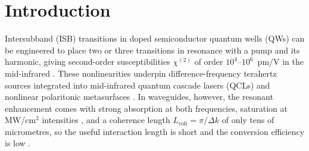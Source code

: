 \documentclass[11pt]{article}
\newcommand{\chitwo}{\chi^{(2)}}
\begin{document}
\begin{abstract}
\end{abstract}

\section{Introduction}
Intersubband (ISB) transitions in doped semiconductor quantum wells (QWs) can be engineered to place two or three transitions in resonance with a pump and its harmonic, giving second-order susceptibilities $\chitwo$ of order $10^4$--$10^6$~pm/V in the mid-infrared \cite{Fejer1989,Rosencher1991,Rosencher1996,Meyer1995,Vurgaftman1996,Vurgaftman2021}. These nonlinearities underpin difference-frequency terahertz sources integrated into mid-infrared quantum cascade lasers (QCLs) \cite{Belkin2007,Fujita2018} and nonlinear polaritonic metasurfaces \cite{Lee2014,Sarma2020,Yu2022,Yu2024,Krakofsky2023}. In waveguides, however, the resonant enhancement comes with strong absorption at both frequencies, saturation at MW/cm$^2$ intensities \cite{Boucaud1991}, and a coherence length $L_\mathrm{coh}=\pi/\Delta k$ of only tens of micrometres, so the useful interaction length is short and the conversion efficiency is low \cite{Vurgaftman2021,Vurgaftman1996,Chesi2023}.
\end{document}
